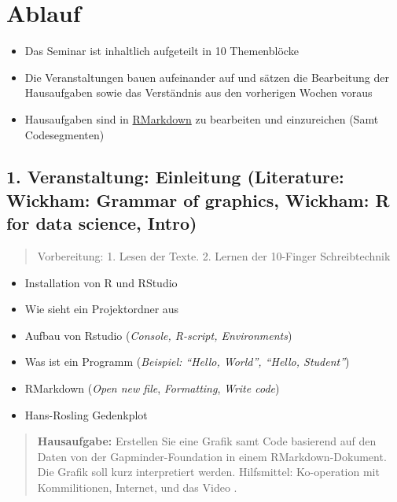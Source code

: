 \section{Ablauf}\label{ablauf}

\begin{itemize}
\tightlist
\item
  Das Seminar ist inhaltlich aufgeteilt in 10 Themenblöcke
\item
  Die Veranstaltungen bauen aufeinander auf und sätzen die Bearbeitung
  der Hausaufgaben sowie das Verständnis aus den vorherigen Wochen
  voraus
\item
  Hausaufgaben sind in \href{https://rmarkdown.rstudio.com/}{RMarkdown}
  zu bearbeiten und einzureichen (Samt Codesegmenten)
\end{itemize}

\subsection{1. Veranstaltung: Einleitung (Literature: Wickham: Grammar
of graphics, Wickham: R for data science,
Intro)}\label{veranstaltung-einleitung-literature-wickham-grammar-of-graphics-wickham-r-for-data-science-intro}

\begin{quote}
Vorbereitung: 1. Lesen der Texte. 2. Lernen der 10-Finger Schreibtechnik
\end{quote}

\begin{itemize}
\tightlist
\item
  Installation von R und RStudio
\item
  Wie sieht ein Projektordner aus
\item
  Aufbau von Rstudio (\emph{Console, R-script, Environments})
\item
  Was ist ein Programm (\emph{Beispiel: ``Hello, World'', ``Hello,
  Student''})
\item
  RMarkdown (\emph{Open new file}, \emph{Formatting}, \emph{Write code})
\item
  Hans-Rosling Gedenkplot
\end{itemize}

\begin{quote}
\textbf{Hausaufgabe:} Erstellen Sie eine Grafik samt Code basierend auf
den Daten von der Gapminder-Foundation in einem RMarkdown-Dokument. Die
Grafik soll kurz interpretiert werden. Hilfsmittel: Ko-operation mit
Kommilitionen, Internet, und das Video .
\end{quote}


